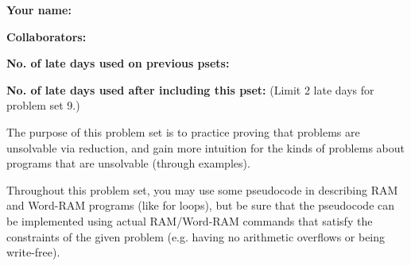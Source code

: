 \documentclass[11pt]{article}
\begin{document}

\textbf{Your name: }

\textbf{Collaborators: }

\textbf{No. of late days used on previous psets: }

\textbf{No. of late days used after including this pset: } \hfill (Limit 2 late days for problem set 9.)

\vspace{1em}

\noindent The purpose of this problem set is to practice proving that problems are unsolvable via reduction, and gain more intuition for the kinds of problems about programs that are unsolvable (through examples). 

Throughout this problem set, you may use some pseudocode in describing RAM and Word-RAM programs (like for loops), but be sure that the pseudocode can be implemented using actual RAM/Word-RAM commands that satisfy the constraints of the given problem (e.g. having no arithmetic overflows or being write-free).
\end{document}
